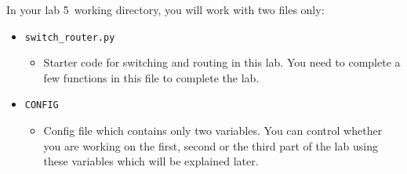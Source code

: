 \documentclass[11pt]{article}
\def\thelab{5}
\begin{document}
In your lab \thelab~working directory, you will work with two files only:
\begin{itemize}
    \item \texttt{switch\_router.py}
        \begin{itemize}
            \item Starter code for switching and routing in this lab. You need to complete a few functions in this file to complete the lab.
        \end{itemize}

    \item \texttt{CONFIG}
        \begin{itemize}
            \item Config file which contains only two variables. You can control whether you are working on the first, second or the third part of the lab using these variables which will be explained later.
        \end{itemize}

\end{itemize}
\end{document}

